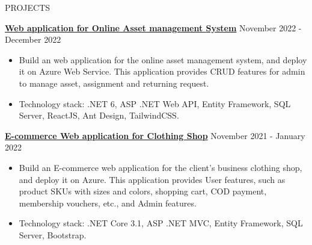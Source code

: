 \begin{rSection}{PROJECTS}

    \quad\textbf{\href{https://github.com/cowienduckie/TheRookiesFinal}{Web application for Online Asset management System}} \hfill November 2022 - December 2022\\
    \begin{itemize}
        \itemsep 0pt {} \vspace{-1em}
        \item Build an web application for the online asset management system, and deploy it on Azure Web Service.
              This application provides CRUD features for admin to manage asset, assignment and returning request.
        \item Technology stack: .NET 6, ASP .NET Web API, Entity Framework, SQL Server, ReactJS, Ant Design, TailwindCSS.
    \end{itemize}

    \vspace{1em}

    \quad\textbf{\href{https://github.com/cowienduckie/clothing-shop}{E-commerce Web application for Clothing Shop}} \hfill November 2021 - January 2022\\
    \begin{itemize}
        \itemsep 0pt {} \vspace{-1em}
        \item Build an E-commerce web application for the client's business clothing shop, and deploy it on Azure.
              This application provides User features, such as product SKUs with sizes and colors, shopping cart, COD payment, membership vouchers, etc., and Admin features.
        \item Technology stack: .NET Core 3.1, ASP .NET MVC, Entity Framework, SQL Server, Bootstrap.
    \end{itemize}

\end{rSection}